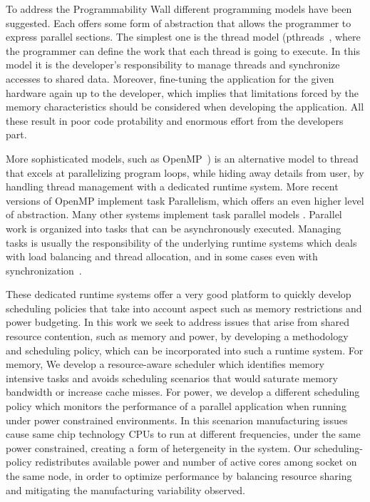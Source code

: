 To address the Programmability Wall different programming models have been suggested.  Each offers some form 
of abstraction that allows the programmer to express parallel sections.  The simplest one is the thread model (pthreads~\cite{Butenhof:1997:PPT:263953},
where the programmer can define the work that each thread is going to execute.  In this model it is the developer's
responsibility to manage threads and synchronize accesses to shared data.  Moreover, fine-tuning the application for the given
hardware again up to the developer, which implies that limitations forced by the memory characteristics should be considered 
when developing the application. All these result in poor code protability and enormous effort from the developers part.   


More sophisticated models, such as
OpenMP~\cite{Chapman:2007:UOP:1370966}) is an alternative model to thread that excels at parallelizing program loops, while hiding away details from 
user, by handling thread management with a dedicated runtime system.  More recent versions of OpenMP implement task Parallelism, which offers  
an even higher level of abstraction.  Many other systems implement task parallel models \cite{4090178, Blumofe:PPoPP1995, Ayguade:TPDS2009, Tzenakis:2012:BBD:2370036.2145864, Jenista:2011:OSO:2038037.1941563, 6099829, Duran:PPL2011}.
Parallel work is organized into tasks that can be asynchronously executed.  
Managing tasks is usually the responsibility of the underlying runtime systems which deals with load balancing and thread allocation,
and in some cases even with synchronization~\cite{DuranIJPP09,Tzenakis:2012:BBD:2370036.2145864,Duran:PPL2011}.  


These dedicated runtime systems offer a very good platform to quickly develop scheduling policies that take into account
aspect such as memory restrictions and power budgeting.  In this work we seek to address issues that arise from shared resource contention, such as memory and power,  by developing
a methodology and scheduling policy, which can be incorporated into such a runtime system.  For memory, We develop a resource-aware
scheduler which identifies memory intensive tasks and avoids scheduling scenarios that would saturate memory bandwidth or increase
cache misses. For power, we develop a different scheduling policy which monitors the performance of a parallel application when running under power constrained environments. In this scenarion manufacturing issues cause same chip technology CPUs to run at different frequencies, under the same power constrained, creating a form of hetergeneity in the system.  Our scheduling-policy redistributes available power
and number of active cores among socket on the same node, in order to optimize performance by balancing resource sharing and mitigating the manufacturing variability observed.

